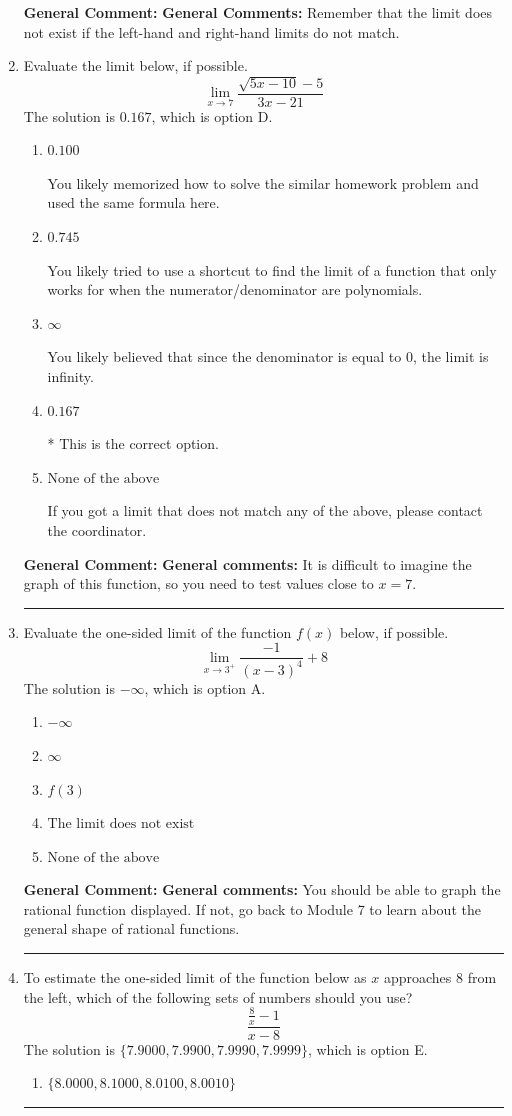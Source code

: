 \documentclass{extbook}[14pt]
\newcommand{\litem}[1]{\item #1

\rule{\textwidth}{0.4pt}}
\begin{document}
\begin{enumerate}
{\textbf{General Comment:} \textbf{General Comments:} Remember that the limit does not exist if the left-hand and right-hand limits do not match.
}
\litem{
Evaluate the limit below, if possible.
\[ \lim_{x \rightarrow 7} \frac{\sqrt{5x - 10} - 5}{3x - 21} \]The solution is \( 0.167 \), which is option D.\begin{enumerate}[label=\Alph*.]
\item \( 0.100 \)

You likely memorized how to solve the similar homework problem and used the same formula here.
\item \( 0.745 \)

You likely tried to use a shortcut to find the limit of a function that only works for when the numerator/denominator are polynomials.
\item \( \infty \)

You likely believed that since the denominator is equal to 0, the limit is infinity.
\item \( 0.167 \)

* This is the correct option.
\item \( \text{None of the above} \)

If you got a limit that does not match any of the above, please contact the coordinator.
\end{enumerate}

\textbf{General Comment:} \textbf{General comments:} It is difficult to imagine the graph of this function, so you need to test values close to $x = 7$.
}
\litem{
Evaluate the one-sided limit of the function $f(x)$ below, if possible.
\[ \lim_{x \rightarrow 3^+} \frac{-1}{(x-3)^4}+8 \]The solution is \( -\infty \), which is option A.\begin{enumerate}[label=\Alph*.]
\item \( -\infty \)


\item \( \infty \)


\item \( f(3) \)


\item \( \text{The limit does not exist} \)


\item \( \text{None of the above} \)


\end{enumerate}

\textbf{General Comment:} \textbf{General comments:} You should be able to graph the rational function displayed. If not, go back to Module 7 to learn about the general shape of rational functions.
}
\litem{
To estimate the one-sided limit of the function below as $x$ approaches 8 from the left, which of the following sets of numbers should you use?
\[ \frac{\frac{8}{x} - 1}{x - 8} \]The solution is \( \{ 7.9000, 7.9900, 7.9990, 7.9999 \} \), which is option E.\begin{enumerate}[label=\Alph*.]
\item \( \{ 8.0000, 8.1000, 8.0100, 8.0010 \} \)


\end{enumerate}}
\end{enumerate}
\end{document}
